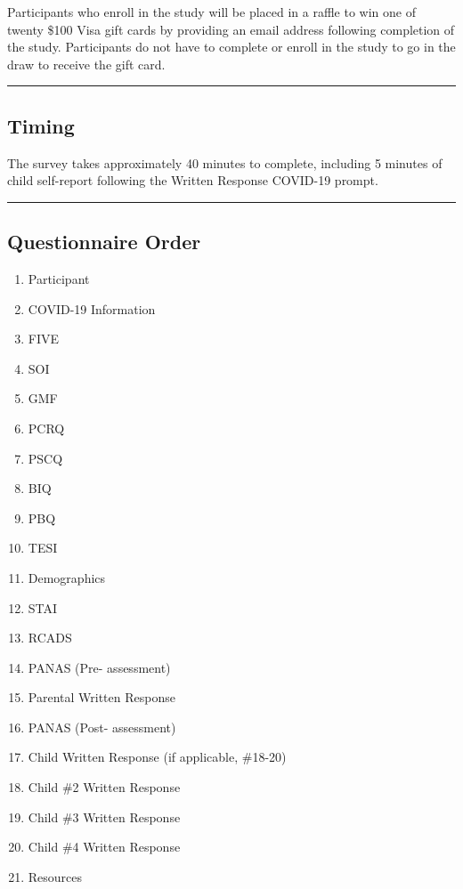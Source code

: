 \documentclass[]{book}
\providecommand{\tightlist}{%
  \setlength{\itemsep}{0pt}\setlength{\parskip}{0pt}}
\begin{document}
Participants who enroll in the study will be placed in a raffle to win one of twenty \$100 Visa gift cards by providing an email address following completion of the study. Participants do not have to complete or enroll in the study to go in the draw to receive the gift card.

\begin{center}\rule{0.5\linewidth}{0.5pt}\end{center}

\hypertarget{timing}{%
\subsection{Timing}\label{timing}}

The survey takes approximately 40 minutes to complete, including 5 minutes of child self-report following the Written Response COVID-19 prompt.

\begin{center}\rule{0.5\linewidth}{0.5pt}\end{center}

\hypertarget{questionnaire-order}{%
\subsection{Questionnaire Order}\label{questionnaire-order}}

\begin{enumerate}
\def\labelenumi{\arabic{enumi}.}
\tightlist
\item
  Participant
\item
  COVID-19 Information
\item
  FIVE
\item
  SOI
\item
  GMF
\item
  PCRQ
\item
  PSCQ
\item
  BIQ
\item
  PBQ
\item
  TESI
\item
  Demographics
\item
  STAI
\item
  RCADS
\item
  PANAS (Pre- assessment)
\item
  Parental Written Response
\item
  PANAS (Post- assessment)
\item
  Child Written Response
  (if applicable, \#18-20)
\item
  Child \#2 Written Response
\item
  Child \#3 Written Response
\item
  Child \#4 Written Response
\item
  Resources
\end{enumerate}
\end{document}
